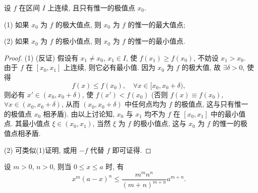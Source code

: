 \begin{figure}[htbp]
\centering
{}
\caption{}\label{fig:3.5.2}
\end{figure}

\begin{theorem}\label{thm:3.5.7}
设 $f$ 在区间 $I$ 上连续, 且只有惟一的极值点 $x_{0}$.

(1) 如果 $x_{0}$ 为 $f$ 的极大值点, 则 $x_{0}$ 为 $f$ 的惟一的最大值点;

(2) 如果 $x_{0}$ 为 $f$ 的极小值点, 则 $x_{0}$ 为 $f$ 的惟一的最小值点.
\end{theorem}

\begin{proof}
(1) (反证) 假设有 $x_{1}\neq x_{0}$, $x_{1}\in I$, 使 $f(x_{1})\geqslant f(x_{0})$, 不妨设 $x_{1}>x_{0}$. 由于 $f$ 在 $[x_{0},x_{1}]$ 上连续, 则它必有最小值. 因为 $x_{0}$ 为 $f$ 的极大值, 故 $\exists\delta>0$, 使得
\[
f(x)\leqslant f(x_{0}),\quad\forall x\in[x_{0},x_{0}+\delta),
\]
则必有 $x'\in(x_{0},x_{0}+\delta)$, 使 $f(x')<f(x_{0})$ (否则 $f(x)\equiv f(x_{0})$, $\forall x\in(x_{0},x_{0}+\delta)$, 从而 $(x_{0},x_{0}+\delta)$ 中任何点均为 $f$ 的极值点, 这与只有惟一的极值点 $x_{0}$ 相矛盾). 由以上讨论知, $x_{0}$ 与 $x_{1}$ 均不为 $f$ 在 $[x_{0},x_{1}]$ 中的最小值点. 其最小值点 $\xi\in(x_{0},x_{1})$, 当然 $\xi$ 为 $f$ 的极小值点, 这与 $x_{0}$ 为 $f$ 的惟一的极值点相矛盾.

(2) 可类似(1)证明, 或用 $-f$ 代替 $f$ 即可证得.
\end{proof}

\begin{example}\label{ex:3.5.11}
设 $m>0$, $n>0$, 则当 $0\leqslant x\leqslant a$ 时, 有
\[
x^{m}(a-x)^{n}\leqslant\frac{m^{m}n^{n}}{(m+n)^{m+n}}a^{m+n}.
\]
\end{example}

